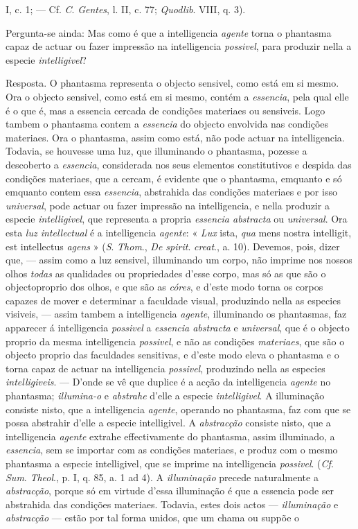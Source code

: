 I, c. 1; --- Cf. \emph{C}. \emph{Gentes}, l. II, c. 77; \emph{Quodlib}. VIII, q. 3).\par Pergunta-se ainda: Mas como é que a intelligencia \emph{agente} torna o phantasma capaz de actuar ou fazer impressão na intelligencia \emph{possivel}, para produzir nella a especie \emph{intelligivel}?\par Resposta. O phantasma representa o objecto sensivel, como está em si mesmo. Ora o objecto sensivel, como está em si mesmo, contém a \emph{essencia}, pela qual elle é o que é, mas a essencia cercada de condições materiaes ou sensiveis. Logo tambem o phantasma contem a \emph{essencia} do objecto envolvida nas condições materiaes. Ora o phantasma, assim como está, não pode actuar na intelligencia. Todavia, se houvesse uma luz, que illuminando o phantasma, pozesse a descoberto a \emph{essencia}, considerada nos seus elementos constitutivos e despida das condições materiaes, que a cercam, é evidente que o phantasma, emquanto e só emquanto contem essa \emph{essencia}, abstrahida das condições materiaes e por isso \emph{universal}, pode actuar ou fazer impressão na intelligencia, e nella produzir a especie \emph{intelligivel}, que representa a propria \emph{essencia abstracta} ou \emph{universal}. Ora esta \emph{luz intellectual} é a intelligencia \emph{agente}: « \emph{Lux} ista, \emph{qua} mens nostra intelligit, est intellectus \emph{agens} » (\emph{S}. \emph{Thom}., \emph{De spirit}. \emph{creat}., a. 10). Devemos, pois, dizer que, --- assim como a luz sensivel, illuminando um corpo, não imprime nos nossos olhos \emph{todas} as qualidades ou propriedades d'esse corpo, mas só as que são o objectoproprio dos olhos, e que são as \emph{córes}, e d'este modo torna os corpos capazes de mover e determinar a faculdade visual, produzindo nella as especies visiveis, --- assim tambem a intelligencia \emph{agente}, illuminando os phantasmas, faz apparecer á intelligencia \emph{possivel} a \emph{essencia abstracta} e \emph{universal}, que é o objecto proprio da mesma intelligencia \emph{possivel}, e não as condições \emph{materiaes}, que são o objecto proprio das faculdades sensitivas, e d'este modo eleva o phantasma e o torna capaz de actuar na intelligencia \emph{possivel}, produzindo nella as especies \emph{intelligiveis}. --- D'onde se vê que duplice é a acção da intelligencia \emph{agente} no phantasma; \emph{illumina-o} e \emph{abstrahe} d'elle a especie \emph{intelligivel}. A illuminação consiste nisto, que a intelligencia \emph{agente}, operando no phantasma, faz com que se possa abstrahir d'elle a especie intelligivel. A \emph{abstracção} consiste nisto, que a intelligencia \emph{agente} extrahe effectivamente do phantasma, assim illuminado, a \emph{essencia}, sem se importar com as condições materiaes, e produz com o mesmo phantasma a especie intelligivel, que se imprime na intelligencia \emph{possivel}. (\emph{Cf}. \emph{Sum}. \emph{Theol}., p. I, q. 85, a. 1 ad 4). A \emph{illuminação} precede naturalmente a \emph{abstracção}, porque só em virtude d'essa illuminação é que a essencia pode ser abstrahida das condições materiaes. Todavia, estes dois actos --- \emph{illuminação} e \emph{abstracção} --- estão por tal forma unidos, que um chama ou suppõe o 